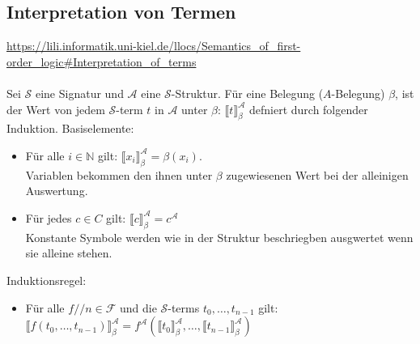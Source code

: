 \documentclass{article}
\begin{document}
    \subsection{Interpretation von Termen}
    \url{https://lili.informatik.uni-kiel.de/llocs/Semantics_of_first-order_logic#Interpretation_of_terms}\\\\
    Sei $\mathcal S$ eine Signatur und $\mathcal A$ eine $\mathcal S$-Struktur. Für eine Belegung ($A$-Belegung) $\beta$, ist der Wert von jedem  $\mathcal S$-term $t$ in $\mathcal A$ unter $\beta$: $\llbracket t\rrbracket_\beta^\mathcal A$ defniert durch folgender Induktion.
    Basiselemente:
    \begin{itemize}
        \item Für alle $i \in \mathbb{N}$ gilt: $\llbracket x_i\rrbracket_\beta^\mathcal A = \beta(x_i)$.\\
            Variablen bekommen den ihnen unter $\beta$ zugewiesenen Wert bei der alleinigen Auswertung.
        \item Für jedes $c \in C$ gilt: $\llbracket c\rrbracket_\beta^\mathcal A = c^{\mathcal A}$\\
            Konstante Symbole werden wie in der Struktur beschriegben ausgwertet wenn sie alleine stehen.
    \end{itemize}
    Induktionsregel:
    \begin{itemize}
        \item Für alle $f/\!/n \in \mathcal F$ und die $\mathcal S$-terms $t_0, \dots, t_{n-1}$ gilt: $\llbracket f(t_0, \dots, t_{n-1})\rrbracket_\beta^\mathcal A = f^\mathcal A(\llbracket t_0\rrbracket_\beta^\mathcal A, \dots, \llbracket t_{n-1}\rrbracket_\beta^\mathcal A)$
    \end{itemize}
\end{document}
